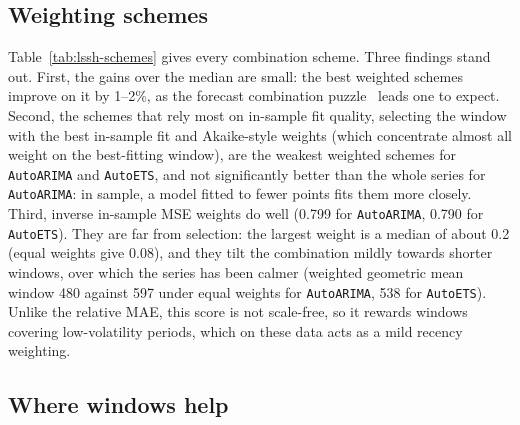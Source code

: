 \documentclass[11pt]{article}
\begin{document}
\begin{table}[t]
\centering\small
\caption{LSSH-99: relative MAE of the whole series, the best fixed window (in
brackets), window selection and window combination. Oracle: best window per
series chosen on the test errors (not a method).}
\label{tab:lssh-main}
\resizebox{\textwidth}{!}{}
\end{table}

\subsection{Weighting schemes}

Table~\ref{tab:lssh-schemes} gives every combination scheme. Three findings
stand out. First, the gains over the median are small: the best weighted
schemes improve on it by 1--2\%, as the forecast combination
puzzle~\citep{smith09puzzle,claeskens16puzzle} leads one to expect. Second,
the schemes that rely most on in-sample fit quality, selecting the window with
the best in-sample fit and Akaike-style weights (which concentrate almost all
weight on the best-fitting window), are the weakest weighted schemes for
\texttt{AutoARIMA} and \texttt{AutoETS}, and not significantly better than the
whole series for \texttt{AutoARIMA}: in sample, a model fitted to fewer points
fits them more closely. Third, inverse
in-sample MSE weights do well (0.799 for \texttt{AutoARIMA}, 0.790 for
\texttt{AutoETS}). They are far from selection: the largest weight is a median
of about 0.2 (equal weights give 0.08), and they tilt the combination mildly
towards shorter windows, over which the series has been calmer (weighted
geometric mean window 480 against 597 under equal weights for
\texttt{AutoARIMA}, 538 for \texttt{AutoETS}). Unlike the relative MAE, this
score is not scale-free, so it rewards windows covering low-volatility periods,
which on these data acts as a mild recency weighting.

\begin{table}[t]
\centering\small
\caption{LSSH-99: relative MAE of each combination scheme, with the number of
series better / worse than the whole series. $^*$: significantly different from
the whole series (Wilcoxon signed-rank, Holm-corrected, $p<0.05$). Bold: best
per forecaster.}
\label{tab:lssh-schemes}
\resizebox{\textwidth}{!}{}
\end{table}

\subsection{Where windows help}
\end{document}
